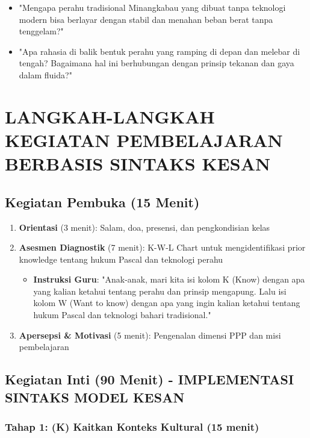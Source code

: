 \documentclass[12pt,a4paper]{article}
\begin{document}
\begin{itemize}
\item "Mengapa perahu tradisional Minangkabau yang dibuat tanpa teknologi modern bisa berlayar dengan stabil dan menahan beban berat tanpa tenggelam?"
\item "Apa rahasia di balik bentuk perahu yang ramping di depan dan melebar di tengah? Bagaimana hal ini berhubungan dengan prinsip tekanan dan gaya dalam fluida?"
\end{itemize}

\section{LANGKAH-LANGKAH KEGIATAN PEMBELAJARAN BERBASIS SINTAKS KESAN}

\subsection{Kegiatan Pembuka (15 Menit)}

\begin{enumerate}
\item \textbf{Orientasi} (3 menit): Salam, doa, presensi, dan pengkondisian kelas
\item \textbf{Asesmen Diagnostik} (7 menit): K-W-L Chart untuk mengidentifikasi prior knowledge tentang hukum Pascal dan teknologi perahu
   \begin{itemize}
   \item \textbf{Instruksi Guru}: "Anak-anak, mari kita isi kolom K (Know) dengan apa yang kalian ketahui tentang perahu dan prinsip mengapung. Lalu isi kolom W (Want to know) dengan apa yang ingin kalian ketahui tentang hukum Pascal dan teknologi bahari tradisional."
   \end{itemize}
\item \textbf{Apersepsi \& Motivasi} (5 menit): Pengenalan dimensi PPP dan misi pembelajaran
\end{enumerate}

\subsection{Kegiatan Inti (90 Menit) - IMPLEMENTASI SINTAKS MODEL KESAN}

\subsubsection{Tahap 1: (K) Kaitkan Konteks Kultural (15 menit)}
\end{document}
